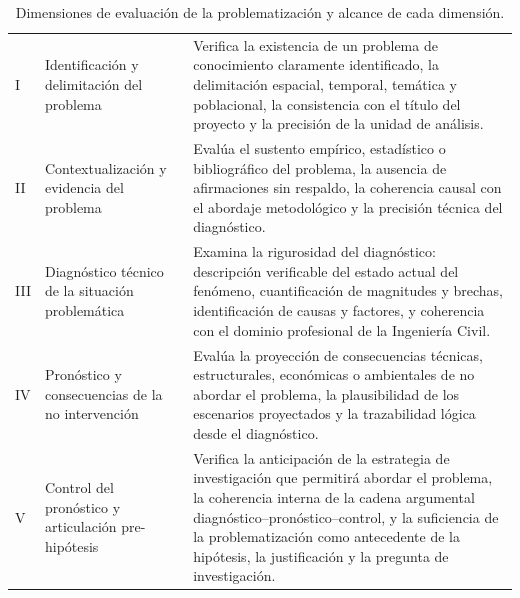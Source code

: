 \begin{table}[htbp]
\centering
\scriptsize
\caption{Dimensiones de evaluación de la problematización y alcance de cada dimensión.}
\label{tab:dim-problematizacion}
\begin{tabularx}{\textwidth}{|C{0.8cm}|L{4.5cm}|X|}
\hline
{}
 &  &  \\ \hline
I & Identificación y delimitación del problema & Verifica la existencia de un problema de conocimiento claramente identificado, la delimitación espacial, temporal, temática y poblacional, la consistencia con el título del proyecto y la precisión de la unidad de análisis. \\ \hline
{}
II & Contextualización y evidencia del problema & Evalúa el sustento empírico, estadístico o bibliográfico del problema, la ausencia de afirmaciones sin respaldo, la coherencia causal con el abordaje metodológico y la precisión técnica del diagnóstico. \\ \hline
III & Diagnóstico técnico de la situación problemática & Examina la rigurosidad del diagnóstico: descripción verificable del estado actual del fenómeno, cuantificación de magnitudes y brechas, identificación de causas y factores, y coherencia con el dominio profesional de la Ingeniería Civil. \\ \hline
{}
IV & Pronóstico y consecuencias de la no intervención & Evalúa la proyección de consecuencias técnicas, estructurales, económicas o ambientales de no abordar el problema, la plausibilidad de los escenarios proyectados y la trazabilidad lógica desde el diagnóstico. \\ \hline
V & Control del pronóstico y articulación pre-hipótesis & Verifica la anticipación de la estrategia de investigación que permitirá abordar el problema, la coherencia interna de la cadena argumental diagnóstico--pronóstico--control, y la suficiencia de la problematización como antecedente de la hipótesis, la justificación y la pregunta de investigación. \\ \hline
\end{tabularx}
\end{table}

